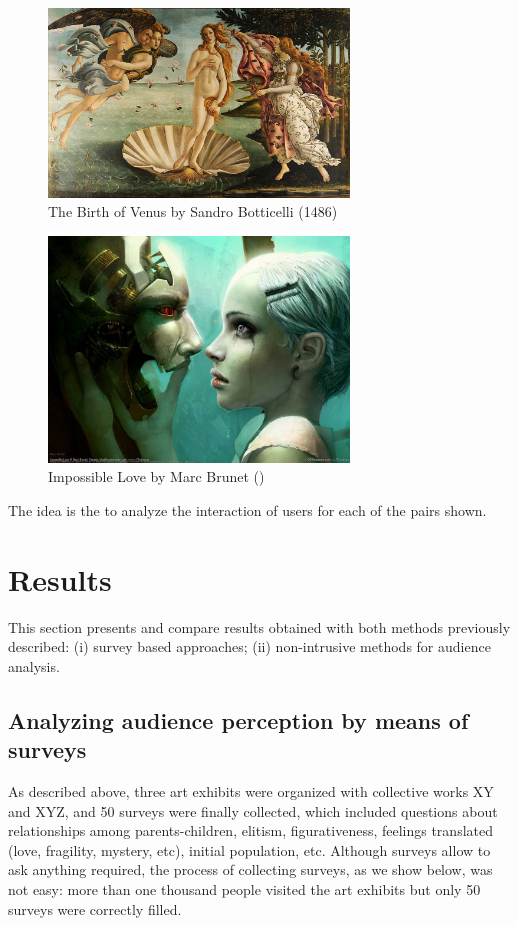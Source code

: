 \documentclass[graybox]{svmult}
\begin{document}
\begin{figure}[t]
\centering 
\includegraphics[width=8cm]{img/Venus.jpg}
\caption{ The Birth of Venus by Sandro Botticelli (1486)}
\label{fig:venus}       %
\end{figure}

\begin{figure}[t]
\centering 
\includegraphics[width=8cm]{img/amorimposible.jpg}
\caption{ Impossible Love by Marc Brunet ()}
\label{fig:impossible}       %
\end{figure}

The idea is the to analyze the interaction of users for each of the pairs shown.

\section{Results}
\label{results}
This section presents and compare results obtained with both methods previously described:  (i) survey based approaches;  (ii) non-intrusive methods for audience analysis.

\subsection{Analyzing audience perception by means of surveys}

As described above, three art exhibits were organized with collective works XY and XYZ, and  50 surveys were finally collected, which included questions about relationships among parents-children, elitism, figurativeness, feelings translated (love, fragility, mystery, etc), initial population, etc.  Although surveys allow to ask anything required, the process of collecting surveys, as we show below, was not easy:  more than one thousand people visited the art exhibits but only 50 surveys were correctly filled.
\end{document}
